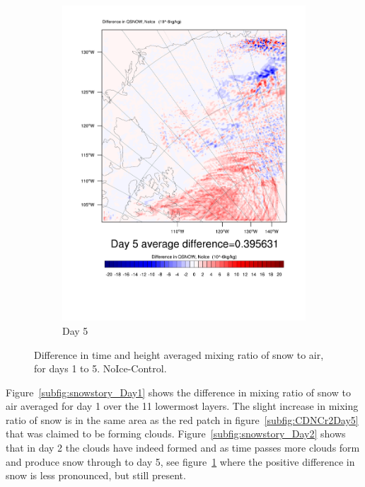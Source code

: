 \begin{figure}
\begin{subfigure}{0.32\textwidth}
		\includegraphics[width=\textwidth]{results/noice/diff_NoIce_qsnow_Day5.pdf}
		\caption{Day 5}
		\label{subfig:snowstory_Day5}
	\end{subfigure}
\caption{Difference in time and height averaged mixing ratio of snow to air, for days 1 to 5. NoIce-Control.}
\label{fig:snowstory}
\end{figure}

Figure~\ref{subfig:snowstory_Day1} shows the difference in mixing ratio of snow to air averaged for day 1 over the 11 lowermost layers. The slight increase in mixing ratio of snow is in the same area as the red patch in figure~\ref{subfig:CDNCr2Day5} that was claimed to be forming clouds. Figure~\ref{subfig:snowstory_Day2} shows that in day 2 the clouds have indeed formed and as time passes more clouds form and produce snow through to day 5, see figure~\ref{subfig:snowstory_Day5} where the positive difference in snow is less pronounced, but still present.

